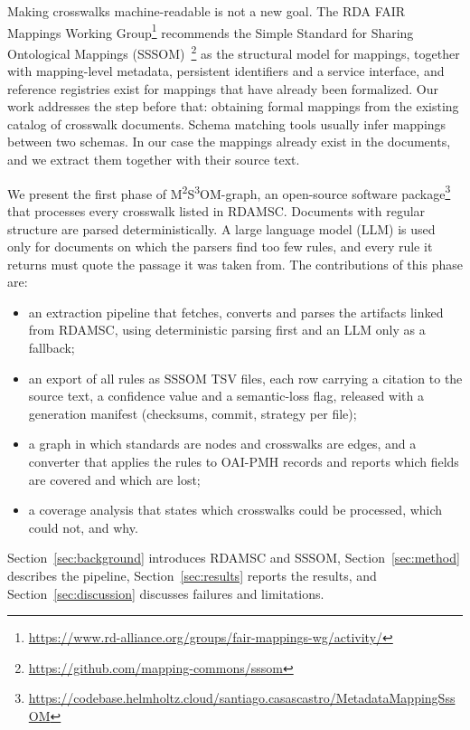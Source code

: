 \documentclass[10pt,twocolumn,a4paper]{extarticle}
\newcommand{\mssom}{\texorpdfstring{M\textsuperscript{2}S\textsuperscript{3}OM-graph}{M2S3OM-graph}\xspace}
\begin{document}
Making crosswalks machine-readable is not a new goal. The RDA FAIR Mappings
Working Group\footnote{\url{https://www.rd-alliance.org/groups/fair-mappings-wg/activity/}}
recommends the Simple Standard for Sharing Ontological Mappings
(SSSOM)~\cite{matentzoglu2022sssom}\footnote{\url{https://github.com/mapping-commons/sssom}}
as the structural model for
mappings, together with mapping-level metadata, persistent identifiers and
a service interface, and reference registries exist for mappings that
have already been formalized.
Our work addresses the step before that: obtaining formal mappings from
the existing catalog of crosswalk documents.
Schema matching tools usually infer mappings between two schemas. In our case the
mappings already exist in the documents, and we extract them together
with their source text.

We present the first phase of \mssom,
an open-source software package\footnote{\url{https://codebase.helmholtz.cloud/santiago.casascastro/MetadataMappingSssOM}}
that processes every crosswalk listed in RDAMSC. Documents with regular
structure are parsed deterministically. A large language model (LLM) is
used only for documents on which the parsers find too few rules, and every
rule it returns must quote the passage it was taken from. The contributions
of this phase are:
\begin{itemize}\setlength{\itemsep}{0pt}
  \item an extraction pipeline that fetches, converts and parses the
        artifacts linked from RDAMSC, using deterministic parsing first and
        an LLM only as a fallback;
  \item an export of all rules as SSSOM TSV files, each
        row carrying a citation to the source text, a confidence value and
        a semantic-loss flag, released with a generation manifest
        (checksums, commit, strategy per file);
  \item a graph in which standards are nodes and crosswalks are edges,
        and a converter that applies the rules to OAI-PMH records and
        reports which fields are covered and which are lost;
  \item a coverage analysis that states which crosswalks could be
        processed, which could not, and why.
\end{itemize}
Section~\ref{sec:background} introduces RDAMSC and SSSOM,
Section~\ref{sec:method} describes the pipeline,
Section~\ref{sec:results} reports the results, and
Section~\ref{sec:discussion} discusses failures and limitations.
\end{document}
